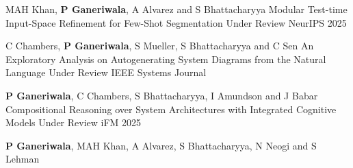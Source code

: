 


\begin{cventries}
\cventry
{MAH Khan, \textbf{P Ganeriwala}, A Alvarez and S Bhattacharyya}
{
Modular Test-time Input-Space Refinement for Few-Shot Segmentation}
{Under Review}
{NeurIPS 2025} 
{ %
\begin{cvitems}
\end{cvitems}
}
\cventry
{C Chambers, \textbf{P Ganeriwala}, S Mueller, S Bhattacharyya and C Sen}
{An Exploratory Analysis on Autogenerating System Diagrams from the Natural Language}
{Under Review}
{IEEE Systems Journal} 
{ %
\begin{cvitems}
\end{cvitems}
}
\cventry
{\textbf{P Ganeriwala}, C Chambers, S Bhattacharyya, I Amundson and J Babar}
{Compositional Reasoning over System Architectures with Integrated Cognitive Models}
{Under Review}
{iFM 2025} 
{ %
\begin{cvitems}
\end{cvitems}
}
\cventry
{\textbf{P Ganeriwala}, MAH Khan, A Alvarez, S Bhattacharyya, N Neogi and S Lehman}

\end{cventries}
